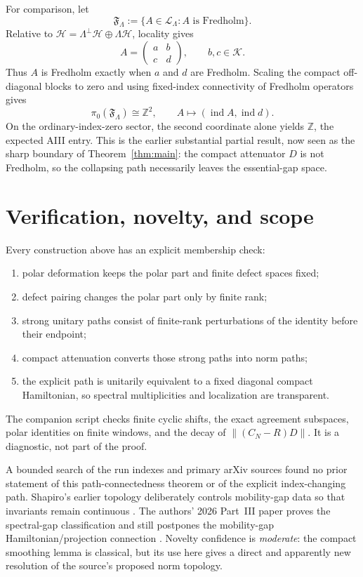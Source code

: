 \documentclass[11pt]{article}
\newcommand{\HH}{\mathcal H}
\newcommand{\KK}{\mathcal K}
\newcommand{\LL}{\mathcal L}
\newcommand{\FF}{\mathfrak F}
\newcommand{\ind}{\operatorname{ind}}
\newcommand{\Z}{\mathbb Z}
\begin{document}
For comparison, let
\[
 \FF_\Lambda:=\{A\in\LL_\Lambda:A\text{ is Fredholm}\}.
\]
Relative to
\(\HH=\Lambda^\perp\HH\oplus\Lambda\HH\), locality gives
\[
 A=\begin{pmatrix}a&b\\c&d\end{pmatrix},
\qquad b,c\in\KK.
\]
Thus \(A\) is Fredholm exactly when \(a\) and \(d\) are Fredholm.  Scaling
the compact off-diagonal blocks to zero and using fixed-index connectivity
of Fredholm operators gives
\[
 \pi_0(\FF_\Lambda)\cong\Z^2,\qquad
 A\longmapsto(\ind A,\ind d).
\]
On the ordinary-index-zero sector, the second coordinate alone yields
\(\Z\), the expected AIII entry.  This is the earlier substantial partial
result, now seen as the sharp boundary of Theorem~\ref{thm:main}: the
compact attenuator \(D\) is not Fredholm, so the collapsing path necessarily
leaves the essential-gap space.

\section{Verification, novelty, and scope}

Every construction above has an explicit membership check:
\begin{enumerate}
\item polar deformation keeps the polar part and finite defect spaces fixed;
\item defect pairing changes the polar part only by finite rank;
\item strong unitary paths consist of finite-rank perturbations of the
identity before their endpoint;
\item compact attenuation converts those strong paths into norm paths;
\item the explicit path is unitarily equivalent to a fixed diagonal compact
Hamiltonian, so spectral multiplicities and localization are transparent.
\end{enumerate}

The companion script checks finite cyclic shifts, the exact agreement
subspaces, polar identities on finite windows, and the decay of
\(\|(C_N-R)D\|\).  It is a diagnostic, not part of the proof.

A bounded search of the run indexes and primary arXiv sources found no prior
statement of this path-connectedness theorem or of the explicit
index-changing path.  Shapiro's earlier topology deliberately controls
mobility-gap data so that invariants remain continuous \cite{Sha}.  The
authors' 2026 Part~III paper proves the spectral-gap classification and
still postpones the mobility-gap Hamiltonian/projection connection
\cite[\S2]{CS3}.  Novelty confidence is \emph{moderate}: the compact
smoothing lemma is classical, but its use here gives a direct and apparently
new resolution of the source's proposed norm topology.
\end{document}
